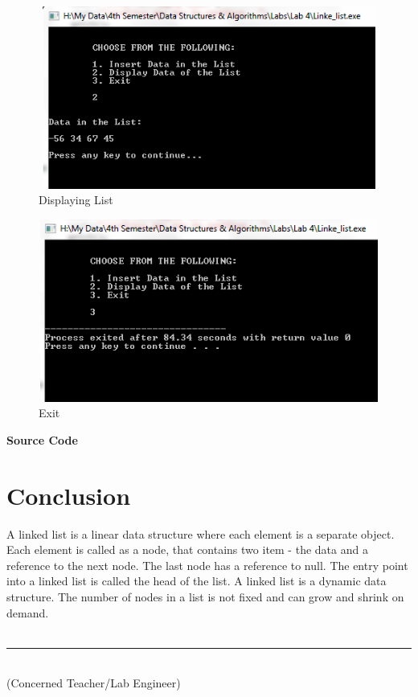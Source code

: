 \documentclass[11pt]{article}            %
\newcommand\tab[1][1cm]{\hspace*{#1}}
\begin{document}
\begin{figure}[H]
\centering
  \includegraphics[width=12cm,height=6cm,keepaspectratio]{3.png}
\caption{Displaying List}
\label{Figure:3}    
\end{figure}

\begin{figure}[H]
\centering
  \includegraphics[width=12cm,height=6cm,keepaspectratio]{4.png}
\caption{Exit}
\label{Figure:4}
\end{figure}

 \textbf {Source Code} \\


\section{Conclusion}
A linked list is a linear data structure where each element is a separate object. Each element is called as a node, that contains two item - the data and a reference to the next node. The last node has a reference to null. The entry point into a linked list is called the head of the list. A linked list is a dynamic data structure. The number of nodes in a list is not fixed and can grow and shrink on demand.\\~\\

\tab[6cm] \noindent\rule{6cm}{0.4pt}\\
\tab[6cm] (Concerned Teacher/Lab Engineer)


 
\end{document}
